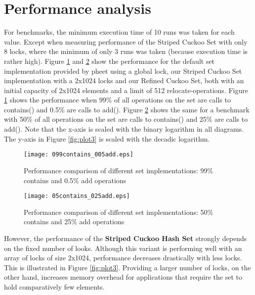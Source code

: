 \documentclass[a4paper,10pt]{article}
\begin{document}
\section{Performance analysis}
\label{sec:performance}
For benchmarks, the minimum execution time of 10 runs was taken for each value. Except when measuring performance of the Striped Cuckoo Set with only 8 locks, where the minimum of only 3 runs was taken (because execution time is rather high).
\medskip
\newline
Figure \ref{fig:plot1} and \ref{fig:plot2} show the performance for the default set implementation provided by pheet using a global lock, our Striped Cuckoo Set implementation with a 2x1024 locks and our Refined Cuckoo Set, both with an initial capacity of 2x1024 elements and a limit of 512 relocate-operations. Figure \ref{fig:plot1} shows the performance when 99\% of all operations on the set are calls to contains() and 0.5\% are calls to add(). Figure \ref{fig:plot2} shows the same for a benchmark with 50\% of all operations on the set are calls to contains() and 25\% are calls to add().
\newline
Note that the x-axis is scaled with the binary logarithm in all diagrams. The y-axis in Figure \ref{fig:plot3} is scaled with the decadic logarithm.

\begin{comment}
todo:
- which variant performs better when?
- asymptotic behaviour
- where is the cross-over point?
- anything unexpected?

\end{comment}


\begin{figure}[H]
\begin{center}
\texttt{[image: 099contains\_005add.eps]}
\end{center}
\caption{Performance comparison of different set implementations: 99\% contains and 0.5\% add operations}
\label{fig:plot1}
\end{figure}

\begin{figure}[H]
\begin{center}
\texttt{[image: 05contains\_025add.eps]}
\end{center}
\caption{Performance comparison of different set implementations: 50\% contains and 25\% add operations}
\label{fig:plot2}
\end{figure}

However, the performance of the \textbf{Striped Cuckoo Hash Set} strongly depends on the fixed number of looks. Although this variant is performing well with an array of locks of size 2x1024, performance decreases drastically with less locks. This is illustrated in Figure \ref{fig:plot3}. Providing a larger number of locks, on the other hand, increases memory overhead for applications that require the set to hold comparatively few elements.
\end{document}
